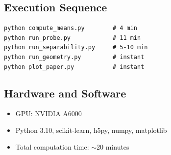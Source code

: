 \documentclass[11pt]{article}
\begin{document}
\subsection{Execution Sequence}
\begin{verbatim}
python compute_means.py        # 4 min
python run_probe.py            # 11 min
python run_separability.py     # 5-10 min
python run_geometry.py         # instant
python plot_paper.py           # instant
\end{verbatim}

\subsection{Hardware and Software}

\begin{itemize}
    \item GPU: NVIDIA A6000
    \item Python 3.10, scikit-learn, h5py, numpy, matplotlib
    \item Total computation time: $\sim$20 minutes
\end{itemize}
\end{document}
